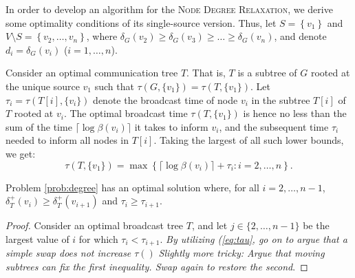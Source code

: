 In order to develop an algorithm for the \textsc{Node Degree Relaxation}, we derive some optimality conditions of its single-source version.
Thus, let $S=\left\{v_1\right\}$ and $V\setminus S=\left\{v_2,\ldots,v_n\right\}$, where $\delta_G(v_2)\geq\delta_G(v_3)\geq\dots\geq\delta_G(v_n)$,
and denote $d_i=\delta_G(v_i)$ ($i=1,\ldots,n$).

Consider an optimal communication tree $T$. That is, $T$ is a subtree of $G$ rooted at the unique source $v_1$ such that
$\tau\left(G,\{v_1\}\right)=\tau\left(T,\{v_1\}\right)$.
Let $\tau_i=\tau\left(T[i],\{v_i\}\right)$ denote the broadcast time of node $v_i$ in the subtree $T[i]$ of $T$ rooted at $v_i$.
The optimal broadcast time $\tau\left(T,\{v_1\}\right)$ is hence no less than the sum of the time $\lceil\log\beta(v_i)\rceil$ it takes to inform $v_i$,
and the subsequent time $\tau_i$ needed to inform all nodes in $T[i]$.
Taking the largest of all such lower bounds, we get:
\begin{equation}
  \tau\left(T,\{v_1\}\right)=\max\left\{\lceil\log\beta(v_i)\rceil+\tau_i: i=2,\ldots,n\right\}. \label{eq:tau}
\end{equation}

\begin{lemma} \label{lem:degree}
Problem \ref{prob:degree} has an optimal solution where, for all $i=2,\ldots,n-1$, $\delta_T^+(v_i)\geq\delta_T^+(v_{i+1})$ and $\tau_i\geq\tau_{i+1}$.
\end{lemma}
\begin{proof}
Consider an optimal broadcast tree $T$, and let $j\in\{2,\ldots,n-1\}$ be the largest value of $i$ for which $\tau_i<\tau_{i+1}$.
\emph{By utilizing (\ref{eq:tau}, go on to argue that a simple swap does not increase $\tau\left(\right)$}
\emph{Slightly more tricky: Argue that moving subtrees can fix the first inequality. Swap again to restore the second}.
\end{proof}

